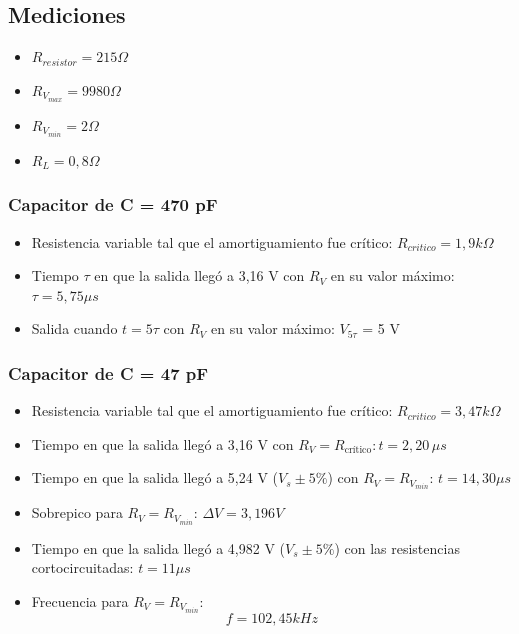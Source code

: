 \documentclass{article}
\begin{document}
    \subsection{Mediciones}
 
        \begin{itemize}
            \item $ R_{resistor} = 215 \Omega $
            \item $ R_{V_{max}} = 9980 \Omega $
            \item $ R_{V_{min}} = 2 \Omega $
            \item $ R_L = 0,8 \Omega $
        \end{itemize}
        
        \par
        \subsubsection*{Capacitor de C = 470 pF}
            \begin{itemize}
                \item Resistencia variable tal que el amortiguamiento fue crítico: $ R_{critico} = 1,9 k\Omega $ %
                \item Tiempo $\tau$ en que la salida llegó a 3,16 V con $ R_V $ en su valor máximo: $ \tau = 5,75 \mu s$ %
                \item Salida cuando $t=5\tau$ con $ R_V $ en su valor máximo: $V_{5\tau}$ = 5 V%
            \end{itemize}

        \par
        \subsubsection*{Capacitor de C = 47 pF}
            \begin{itemize}
                \item Resistencia variable tal que el amortiguamiento fue crítico: $ R_{critico} = 3,47 k\Omega $ %
                \item Tiempo en que la salida llegó a 3,16 V con $ R_V = R_{\text{crítico}} \colon t = 2,20 \, \mu s$ %
                \item Tiempo en que la salida llegó a 5,24 V ($V_s \pm 5\% $) con $ R_V=R_{V_{min}}$: $ t = 14,30 \mu s$ %
                \item Sobrepico para $R_V = R_{V_{min}}$: $ \Delta V = 3,196 V $
                \item Tiempo en que la salida llegó a 4,982 V ($V_s \pm 5\% $) con las resistencias cortocircuitadas: $ t = 11 \mu s$ %
                \item Frecuencia para $ R_V = R_{V_{min}} $:
                \begin{equation*}
                    f = 102,45 kHz
                \end{equation*} \par
            \end{itemize}
\end{document}
